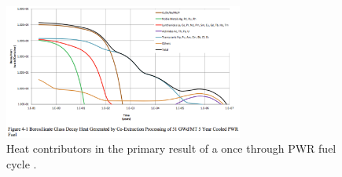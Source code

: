 \begin{figure}[htbp!]
  \begin{center}
    \includegraphics[width=0.7\textwidth]{carter_coex_heat.eps}
  \end{center}
  \caption{Heat contributors in the primary result of a once through PWR fuel 
    cycle \cite{carter_us_2011}.}
  \label{fig:carter_coex_heat}
\end{figure}
